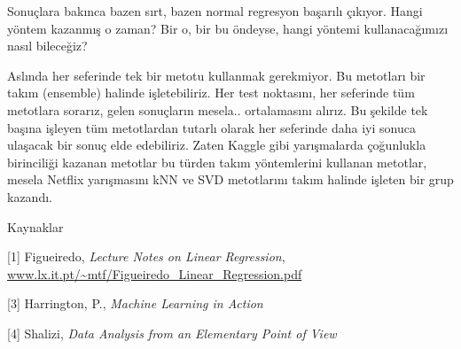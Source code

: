 \documentclass[12pt,fleqn]{article}\usepackage{../../common}
\begin{document}
Sonuçlara bakınca bazen sırt, bazen normal regresyon başarılı çıkıyor.
Hangi yöntem kazanmış o zaman? Bir o, bir bu öndeyse, hangi yöntemi
kullanacağımızı nasıl bileceğiz?

Aslında her seferinde tek bir metotu kullanmak gerekmiyor. Bu metotları bir
takım (ensemble) halinde işletebiliriz. Her test noktasını, her seferinde
tüm metotlara sorarız, gelen sonuçların mesela.. ortalamasını alırız. Bu
şekilde tek başına işleyen tüm metotlardan tutarlı olarak her seferinde
daha iyi sonuca ulaşacak bir sonuç elde edebiliriz. Zaten Kaggle gibi
yarışmalarda çoğunlukla birinciliği kazanan metotlar bu türden takım
yöntemlerini kullanan metotlar, mesela Netflix yarışmasını kNN ve SVD
metotlarını takım halinde işleten bir grup kazandı.

Kaynaklar

[1] Figueiredo, {\em Lecture Notes on Linear Regression}, \url{www.lx.it.pt/~mtf/Figueiredo_Linear_Regression.pdf}

[3] Harrington, P., {\em Machine Learning in Action}

[4] Shalizi, {\em Data Analysis from an Elementary Point of View}
\end{document}
